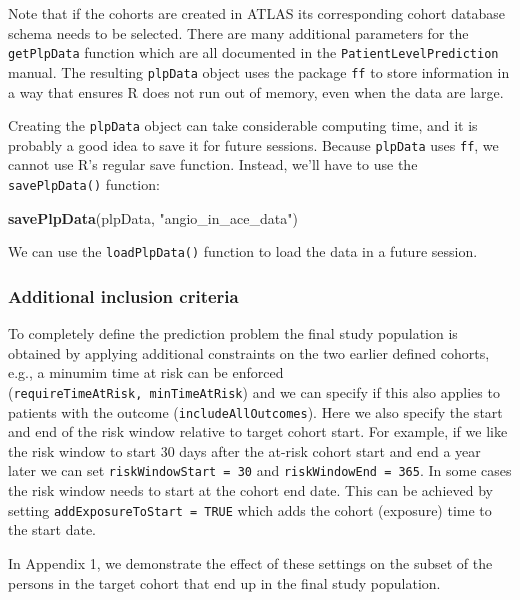 \documentclass[
]{article}
\newenvironment{Shaded}{\begin{snugshade}}{\end{snugshade}}
\newcommand{\KeywordTok}[1]{\textcolor[rgb]{0.13,0.29,0.53}{\textbf{#1}}}
\newcommand{\NormalTok}[1]{#1}
\newcommand{\StringTok}[1]{\textcolor[rgb]{0.31,0.60,0.02}{#1}}
\begin{document}
Note that if the cohorts are created in ATLAS its corresponding cohort
database schema needs to be selected. There are many additional
parameters for the \texttt{getPlpData} function which are all documented
in the \texttt{PatientLevelPrediction} manual. The resulting
\texttt{plpData} object uses the package \texttt{ff} to store
information in a way that ensures R does not run out of memory, even
when the data are large.

Creating the \texttt{plpData} object can take considerable computing
time, and it is probably a good idea to save it for future sessions.
Because \texttt{plpData} uses \texttt{ff}, we cannot use R's regular
save function. Instead, we'll have to use the \texttt{savePlpData()}
function:

\begin{Shaded}
\begin{Highlighting}[]
\KeywordTok{savePlpData}\NormalTok{(plpData, }\StringTok{"angio_in_ace_data"}\NormalTok{)}
\end{Highlighting}
\end{Shaded}

We can use the \texttt{loadPlpData()} function to load the data in a
future session.

\hypertarget{additional-inclusion-criteria-1}{%
\subsubsection{Additional inclusion
criteria}\label{additional-inclusion-criteria-1}}

To completely define the prediction problem the final study population
is obtained by applying additional constraints on the two earlier
defined cohorts, e.g., a minumim time at risk can be enforced
(\texttt{requireTimeAtRisk,\ minTimeAtRisk}) and we can specify if this
also applies to patients with the outcome (\texttt{includeAllOutcomes}).
Here we also specify the start and end of the risk window relative to
target cohort start. For example, if we like the risk window to start 30
days after the at-risk cohort start and end a year later we can set
\texttt{riskWindowStart\ =\ 30} and \texttt{riskWindowEnd\ =\ 365}. In
some cases the risk window needs to start at the cohort end date. This
can be achieved by setting \texttt{addExposureToStart\ =\ TRUE} which
adds the cohort (exposure) time to the start date.

In Appendix 1, we demonstrate the effect of these settings on the subset
of the persons in the target cohort that end up in the final study
population.
\end{document}
